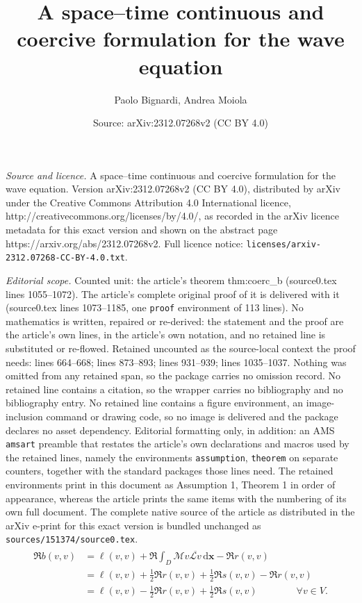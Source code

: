\documentclass[10pt,a4paper]{amsart}
\title{A space--time continuous and coercive formulation for the wave equation}
\author{Paolo Bignardi, Andrea Moiola}
\date{Source: arXiv:2312.07268v2 (CC BY 4.0)}
\newcommand{\conj}[1]{\overline{#1}}
\newcommand{\dx}{{\,\mathrm{d}\vect x}}
\newcommand{\operator}[1]{\mathcal{#1}}
\newcommand{\vect}[1]{\bm{#1}}
\begin{document}
\maketitle

\noindent\emph{Source and licence.} A space--time continuous and coercive formulation for the wave equation. Version arXiv:2312.07268v2 (CC BY 4.0), distributed by arXiv under the Creative Commons Attribution 4.0 International licence, http://creativecommons.org/licenses/by/4.0/, as recorded in the arXiv licence metadata for this exact version and shown on the abstract page https://arxiv.org/abs/2312.07268v2. Full licence notice: \texttt{licenses/arxiv-2312.07268-CC-BY-4.0.txt}.\par\smallskip

\noindent\textit{Editorial scope.} Counted unit: the article's theorem thm:coerc\_b (source0.tex lines 1055--1072). The article's complete original proof of it is delivered with it (source0.tex lines 1073--1185, one \texttt{proof} environment of 113 lines). No mathematics is written, repaired or re-derived: the statement and the proof are the article's own lines, in the article's own notation, and no retained line is substituted or re-flowed.  Retained uncounted as the source-local context the proof needs: lines 664--668; lines 873--893; lines 931--939; lines 1035--1037.  Nothing was omitted from any retained span, so the package carries no omission record.  No retained line contains a citation, so the wrapper carries no bibliography and no bibliography entry.  No retained line contains a figure environment, an image-inclusion command or drawing code, so no image is delivered and the package declares no asset dependency.  Editorial formatting only, in addition: an AMS \texttt{amsart} preamble that restates the article's own declarations and macros used by the retained lines, namely the environments \texttt{assumption}, \texttt{theorem} on separate counters, together with the standard packages those lines need.  The retained environments print in this document as Assumption 1, Theorem 1 in order of appearance, whereas the article prints the same items with the numbering of its own full document.  The complete native source of the article as distributed in the arXiv e-print for this exact version is bundled unchanged as \texttt{sources/151374/source0.tex}.
\begin{align}\begin{aligned}
		\Re b(v,v) & = \ell(v,v) + \Re \int_D \operator{M}v \conj{\operator{L}v} \dx - \Re r(v,v)               \\
		           & = \ell(v, v) + \frac{1}{2} \Re r(v,v) + \frac{1}{2} \Re s(v,v) - \Re r(v,v)                \\
		           & = \ell(v, v) - \frac{1}{2}\Re r(v,v) + \frac{1}{2} \Re s(v,v) \qquad\qquad \forall v\in V.
	\end{aligned}\label{eq:abstract_coercivity_condition}\end{align}
\end{document}
